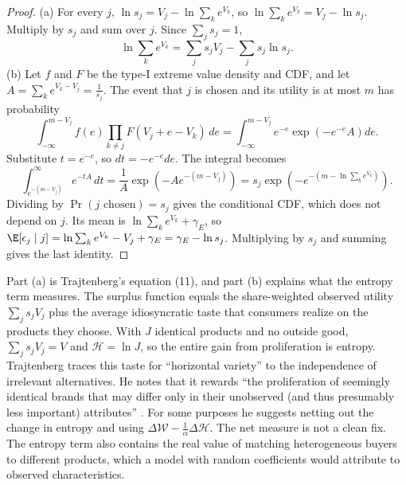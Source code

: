 \begin{proof}
(a) For every $j$, $\ln s_j = V_j - \ln\sum_k e^{V_k}$, so $\ln\sum_k e^{V_k} = V_j - \ln s_j$. Multiply by $s_j$
and sum over $j$. Since $\sum_j s_j = 1$,
\begin{equation*}
\ln\sum_k e^{V_k} = \sum_j s_jV_j - \sum_j s_j\ln s_j .
\end{equation*}
(b) Let $f$ and $F$ be the type-I extreme value density and CDF, and let $A = \sum_k e^{V_k - V_j} =
\frac{1}{s_j}$. The event that $j$ is chosen and its utility is at most $m$ has probability
\begin{equation*}
\int_{-\infty}^{m - V_j} f(e)\prod_{k\ne j}F(V_j + e - V_k)\,de
= \int_{-\infty}^{m - V_j} e^{-e}\exp\left(-e^{-e}A\right)de .
\end{equation*}
Substitute $t = e^{-e}$, so $dt = -e^{-e}de$. The integral becomes
\begin{equation*}
\int_{e^{-(m - V_j)}}^{\infty}e^{-tA}\,dt = \frac{1}{A}\exp\left(-Ae^{-(m-V_j)}\right)
= s_j\exp\left(-e^{-\left(m - \ln\sum_k e^{V_k}\right)}\right).
\end{equation*}
Dividing by $\Pr(j\text{ chosen}) = s_j$ gives the conditional CDF, which does not depend on $j$. Its mean is
$\ln\sum_k e^{V_k} + \gamma_E$, so $\E[\epsilon_j\mid j] = \ln\sum_k e^{V_k} - V_j + \gamma_E = \gamma_E - \ln s_j$.
Multiplying by $s_j$ and summing gives the last identity.
\end{proof}

Part (a) is Trajtenberg's equation (11), and part (b) explains what the entropy term measures. The surplus
function equals the share-weighted observed utility $\sum_j s_jV_j$ plus the average idiosyncratic taste that
consumers realize on the products they choose. With $J$ identical products and no outside good,
$\sum_j s_jV_j = V$ and $\mathcal{H} = \ln J$, so the entire gain from proliferation is entropy. Trajtenberg
traces this taste for ``horizontal variety'' to the independence of irrelevant alternatives. He notes that it
rewards ``the proliferation of seemingly identical brands that may differ only in their unobserved (and thus
presumably less important) attributes'' \citep[p.~19]{Trajtenberg1985}. For some purposes he suggests netting
out the change in entropy and using $\Delta\mathcal{W} - \frac{1}{\alpha}\Delta\mathcal{H}$. The net measure is not
a clean fix. The entropy term also contains the real value of matching heterogeneous buyers to different
products, which a model with random coefficients would attribute to observed characteristics.

